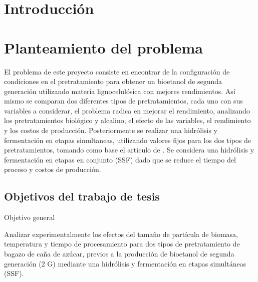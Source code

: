 \documentclass[12pt]{article}
\begin{document}
	
	\pagestyle{empty}
	
	
	\tableofcontents
	\date{}
     \newpage
	\listoftables
	\clearpage
	\newpage
	
	
	\pagestyle{plain}
	\setcounter{page}{1} 
	
		\section{Introducción}
	
	
	\section{Planteamiento del problema}
		
 
		El problema de este proyecto consiste  en encontrar de la configuración de condiciones en el pretratamiento para obtener un bioetanol de segunda generación utilizando materia lignocelulósica con mejores rendimientos. Así mismo se comparan dos diferentes tipos de pretratamientos, cada uno con sus variables a considerar, el problema radica en mejorar el rendimiento, analizando los pretratamientos biológico y alcalino, el efecto de las variables, el rendimiento y los costos de producción. Posteriormente se realizar una hidrólisis y fermentación en etapas simultaneas, utilizando valores fijos para los dos tipos de pretratamientos, tomando como base el articulo de  \cite{Arturo2022evaluacion}. Se considera una hidrólisis y fermentación en etapas en conjunto (SSF) dado que se reduce el tiempo del proceso y costos de producción. 		   
	
		
		
		
		
	\subsection{Objetivos del trabajo de tesis}
	{\large Objetivo general}
	
	Analizar experimentalmente los efectos del tamaño de partícula de biomasa, temperatura y tiempo de procesamiento para dos tipos de pretratamiento de bagazo de caña de azúcar, previos a la producción de bioetanol de segunda generación (2 G) mediante una hidrólisis y fermentación en etapas simultáneas (SSF). \newline \newline
	
\end{document}
